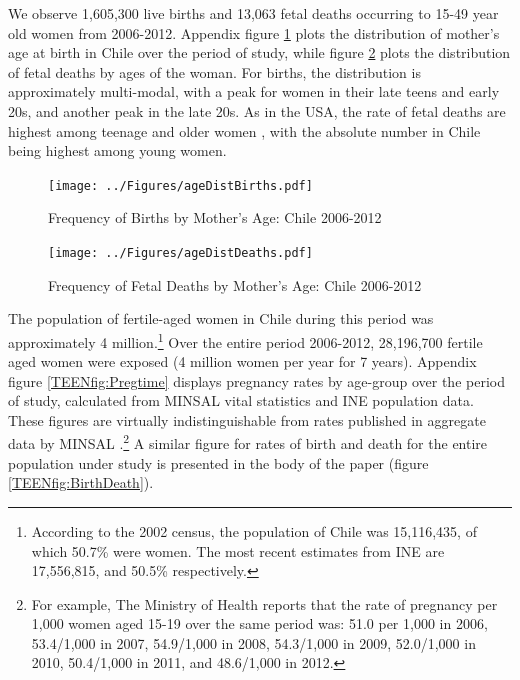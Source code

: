 \documentclass[11pt,subeqn]{article}
\begin{document}
\begin{spacing}{1.4}

We observe 1,605,300 live births and 13,063 fetal deaths occurring to 15-49 year 
old women from 2006-2012.  Appendix figure \ref{TEENfig:ageHist} plots the 
distribution of mother's age at birth in Chile over the period of study, while
figure \ref{TEENfig:ageHistD} plots the distribution of fetal deaths by ages of
the woman.  For births, the distribution is approximately multi-modal, with a 
peak for women in their late teens and early 20s, and another peak in the late 
20s.  As in the USA, the rate of fetal deaths are highest among teenage and 
older women \citep{MacDormanGregory2015}, with the absolute number in Chile 
being highest among young women.

\begin{figure}[htpb!]
\begin{center}
\caption{Frequency of Births by Mother's Age: Chile 2006-2012}
\label{TEENfig:ageHist}
\texttt{[image: ../Figures/ageDistBirths.pdf]} 
\end{center}
\end{figure}

\begin{figure}[htpb!]
\begin{center}
\caption{Frequency of Fetal Deaths by Mother's Age: Chile 2006-2012}
\label{TEENfig:ageHistD}
\texttt{[image: ../Figures/ageDistDeaths.pdf]} 
\end{center}
\vspace{-4mm}
\end{figure}

The population of fertile-aged women in Chile during this period was 
approximately 4 million.\footnote{According to the 2002 census, the population
of Chile was 15,116,435, of which 50.7\% were women.  The most recent estimates
from INE are 17,556,815, and 50.5\% respectively.}  Over the entire period 
2006-2012, 28,196,700 fertile aged women were exposed (4 million women per year
for 7 years).  Appendix figure \ref{TEENfig:Pregtime} displays pregnancy rates 
by age-group over the period of study, calculated from MINSAL vital statistics
and INE population data.  These figures are virtually indistinguishable from
rates published in aggregate data by MINSAL \citep{MINSAL2013}.\footnote{For
example, The Ministry of Health reports that the rate of pregnancy per 1,000
women aged 15-19 over the same period was: 51.0 per 1,000 in 2006, 53.4/1,000
in 2007, 54.9/1,000 in 2008, 54.3/1,000 in 2009, 52.0/1,000 in 2010, 
50.4/1,000 in 2011, and 48.6/1,000 in 2012.}  A similar figure for rates of
birth and death for the entire population under study is presented in the
body of the paper (figure \ref{TEENfig:BirthDeath}).


\end{spacing}
\end{document}
